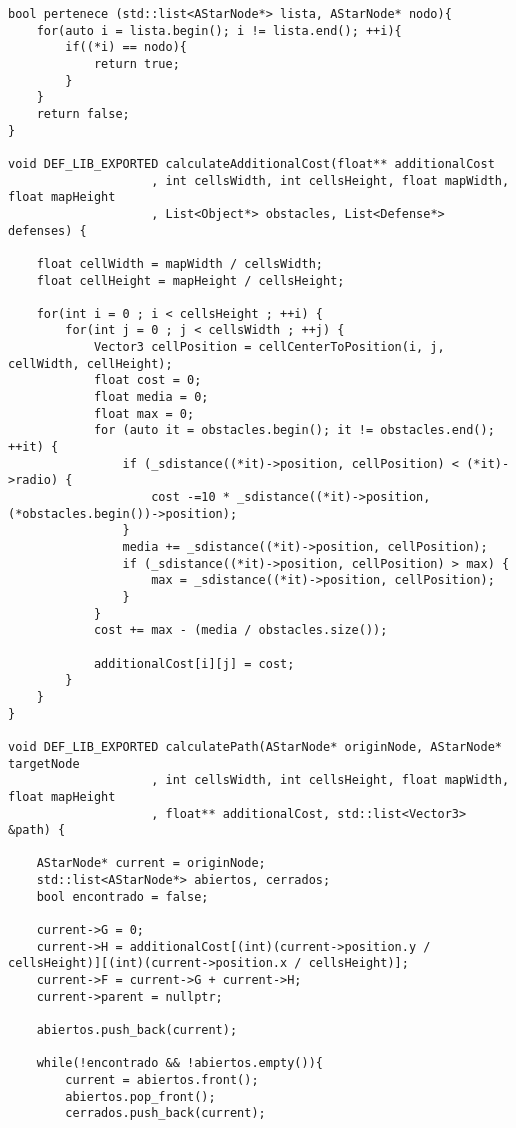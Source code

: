\begin{lstlisting}
bool pertenece (std::list<AStarNode*> lista, AStarNode* nodo){
    for(auto i = lista.begin(); i != lista.end(); ++i){
        if((*i) == nodo){
            return true;
        }
    }
    return false;
}

void DEF_LIB_EXPORTED calculateAdditionalCost(float** additionalCost
                    , int cellsWidth, int cellsHeight, float mapWidth, float mapHeight
                    , List<Object*> obstacles, List<Defense*> defenses) {

    float cellWidth = mapWidth / cellsWidth;
    float cellHeight = mapHeight / cellsHeight;

    for(int i = 0 ; i < cellsHeight ; ++i) {
        for(int j = 0 ; j < cellsWidth ; ++j) {
            Vector3 cellPosition = cellCenterToPosition(i, j, cellWidth, cellHeight);
            float cost = 0;
            float media = 0;
            float max = 0;
            for (auto it = obstacles.begin(); it != obstacles.end(); ++it) {
                if (_sdistance((*it)->position, cellPosition) < (*it)->radio) {
                    cost -=10 * _sdistance((*it)->position, (*obstacles.begin())->position);
                }
                media += _sdistance((*it)->position, cellPosition);
                if (_sdistance((*it)->position, cellPosition) > max) {
                    max = _sdistance((*it)->position, cellPosition);
                }
            }
            cost += max - (media / obstacles.size());
            
            additionalCost[i][j] = cost;
        }
    }
}

void DEF_LIB_EXPORTED calculatePath(AStarNode* originNode, AStarNode* targetNode
                    , int cellsWidth, int cellsHeight, float mapWidth, float mapHeight
                    , float** additionalCost, std::list<Vector3> &path) {

    AStarNode* current = originNode;
    std::list<AStarNode*> abiertos, cerrados;
    bool encontrado = false;

    current->G = 0;
    current->H = additionalCost[(int)(current->position.y / cellsHeight)][(int)(current->position.x / cellsHeight)];
    current->F = current->G + current->H;
    current->parent = nullptr;

    abiertos.push_back(current);

    while(!encontrado && !abiertos.empty()){
        current = abiertos.front();
        abiertos.pop_front();
        cerrados.push_back(current);


\end{lstlisting}
